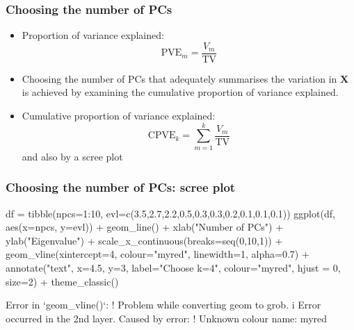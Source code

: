 \documentclass[a4paper]{article}\usepackage[]{graphicx}\usepackage[]{xcolor}
\begin{document}
\subsubsection{Choosing the number of PCs}
\begin{itemize}
	\item Proportion of variance explained:
	\[
		\mathrm{PVE}_m = \frac{V_m}{\mathrm{TV}}
	\]
	\item Choosing the number of PCs that adequately summarises the variation in \( \symbf{X} \) is achieved by examining the cumulative proportion of variance explained.
	\item Cumulative proportion of variance explained:
	\[
		\mathrm{CPVE}_k = \sum_{m=1}^k\frac{V_m}{\mathrm{TV}}
	\]
	and also by a scree plot
\end{itemize}
\subsubsection{Choosing the number of PCs: scree plot}
\begin{Schunk}
\begin{Sinput}
df = tibble(npcs=1:10, evl=c(3.5,2.7,2.2,0.5,0.3,0.3,0.2,0.1,0.1,0.1))
ggplot(df, aes(x=npcs, y=evl)) + geom_line() + 
  xlab("Number of PCs") + ylab("Eigenvalue") +
  scale_x_continuous(breaks=seq(0,10,1)) + geom_vline(xintercept=4, colour="myred", linewidth=1, alpha=0.7) +
  annotate("text", x=4.5, y=3, label="Choose k=4", colour="myred", hjust = 0, size=2) +
  theme_classic() 
\end{Sinput}
\begin{Soutput}
Error in `geom_vline()`:
! Problem while converting geom to grob.
i Error occurred in the 2nd layer.
Caused by error:
! Unknown colour name: myred
\end{Soutput}
\end{Schunk}
\end{document}
